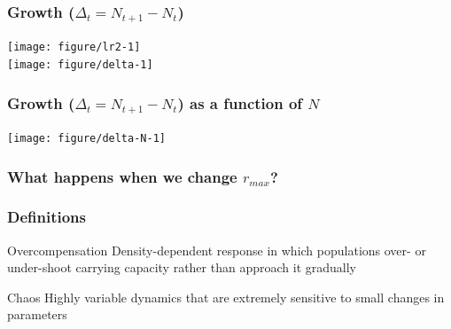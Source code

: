 \documentclass[color=usenames,dvipsnames]{beamer}\usepackage[]{graphicx}\usepackage[]{color}
\begin{document}
\begin{frame}[fragile]
  \frametitle{Growth ($\Delta_t=N_{t+1}-N_t$)}


\begin{center}
  \texttt{[image: figure/lr2-1]} \\ \vfill
  \texttt{[image: figure/delta-1]}
\end{center}
\end{frame}



\begin{frame}[fragile]
  \frametitle{Growth ($\Delta_t=N_{t+1}-N_t$) as a function of $N$}

\begin{center}
  \texttt{[image: figure/delta-N-1]}
\end{center}
\end{frame}






\begin{frame}[fragile]
  \frametitle{What happens when we change $r_{max}$?}





\begin{center}
\end{center}
\end{frame}





\begin{frame}
  \frametitle{Definitions}
  \begin{block}{Overcompensation}
    Density-dependent response in which populations over- or
    under-shoot carrying capacity rather than approach it gradually
  \end{block}
  \pause
  \begin{block}{Chaos}
    Highly variable dynamics that are extremely sensitive to small
    changes in parameters
  \end{block}
\end{frame}






%
\end{document}
